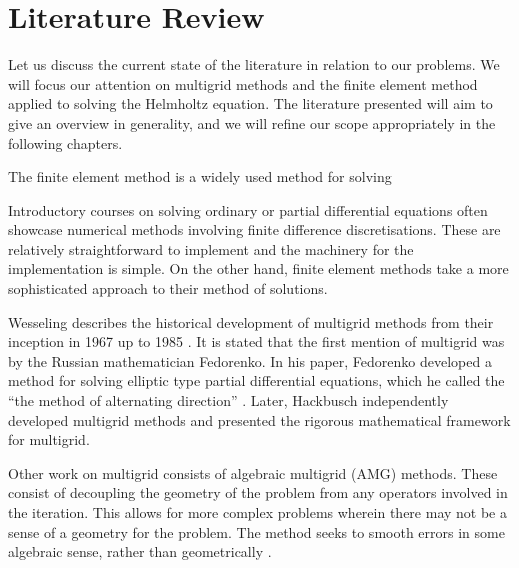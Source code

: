 
\section{Literature Review}

\iffalse

Topics to cover:
	Solving Poisson problem
	Solving Helmholtz
	Complex shifted laplacian
	Multigrid
	Cylindrical coordinates

Mention one or two references for each, try and reach >2 pages.

\fi

Let us discuss the current state of the literature in relation to our problems.
We will focus our attention on multigrid methods and the finite element method applied to solving the Helmholtz equation.
The literature presented will aim to give an overview in generality, and we will refine our scope appropriately in the following chapters.


The finite element method is a widely used method for solving

Introductory courses on solving ordinary or partial differential equations often showcase numerical methods involving finite difference discretisations.
These are relatively straightforward to implement and the machinery for the implementation is simple.
On the other hand, finite element methods take a more sophisticated approach to their method of solutions.


Wesseling describes the historical development of multigrid methods from their inception in 1967 up to 1985 \cite{wesseling}.
It is stated that the first mention of multigrid was by the Russian mathematician Fedorenko.
In his paper, Fedorenko developed a method for solving elliptic type partial differential equations, which he called the ``the method of alternating direction'' \cite{fedorenko}.
Later, Hackbusch independently developed multigrid methods and presented the rigorous mathematical framework for multigrid.

Other work on multigrid consists of algebraic multigrid (AMG) methods.
These consist of decoupling the geometry of the problem from any operators involved in the iteration.
This allows for more complex problems wherein there may not be a sense of a geometry for the problem.
The method seeks to smooth errors in some algebraic sense, rather than geometrically \cite{briggs}.

